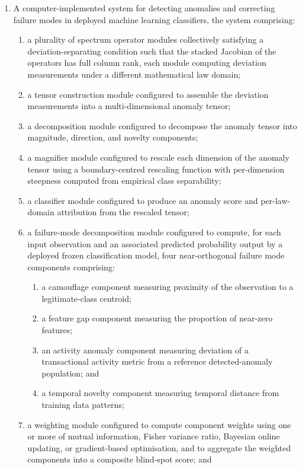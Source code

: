 \documentclass[12pt,a4paper]{article}
\begin{document}
\begin{enumerate}[label=\textbf{\arabic*.}]
\item A computer-implemented system for detecting anomalies and correcting
failure modes in deployed machine learning classifiers, the system
comprising:
\begin{enumerate}[label=(\alph*)]
\item a plurality of spectrum operator modules collectively satisfying a
deviation-separating condition such that the stacked Jacobian of the
operators has full column rank, each module computing deviation measurements
under a different mathematical law domain;

\item a tensor construction module configured to assemble the deviation
measurements into a multi-dimensional anomaly tensor;

\item a decomposition module configured to decompose the anomaly tensor into
magnitude, direction, and novelty components;

\item a magnifier module configured to rescale each dimension of the anomaly
tensor using a boundary-centred rescaling function with per-dimension
steepness computed from empirical class separability;

\item a classifier module configured to produce an anomaly score and
per-law-domain attribution from the rescaled tensor;

\item a failure-mode decomposition module configured to compute, for each
input observation and an associated predicted probability output by a
deployed frozen classification model, four near-orthogonal failure mode
components comprising:
\begin{enumerate}[label=(\roman*)]
\item a camouflage component measuring proximity of the observation to a
legitimate-class centroid;
\item a feature gap component measuring the proportion of near-zero features;
\item an activity anomaly component measuring deviation of a transactional
activity metric from a reference detected-anomaly population; and
\item a temporal novelty component measuring temporal distance from training
data patterns;
\end{enumerate}

\item a weighting module configured to compute component weights using one
or more of mutual information, Fisher variance ratio, Bayesian online
updating, or gradient-based optimisation, and to aggregate the weighted
components into a composite blind-spot score; and


\end{enumerate}
\end{enumerate}
\end{document}
